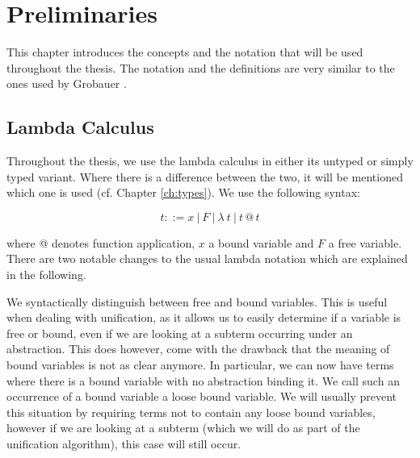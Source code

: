\newcommand{\app}{\mathbin{@}}
\newcommand{\abstr}[1]{\lambda \ #1}
\newcommand{\abstrm}[2]{\lambda_{#1} \ #2}
\newcommand{\abstrn}[2]{\lambda #1. \ #2}
\newcommand{\subst}[3]{#1 \left[#2 / #3 \right]}
\newcommand{\doubleplus}{\mathbin{+\mkern-10mu+}}
\newcommand{\cons}{\textbf{:}}
\newcommand{\betar}{\longrightarrow_\beta}
\newcommand{\betars}{\overset{*}{\longrightarrow}_\beta}
\newcommand{\betart}{\overset{+}{\longrightarrow}_\beta}
\newcommand{\betarm}[1]{\overset{#1}{\longrightarrow}_\beta}
\newcommand{\free}[2]{\text{free $#1$ $#2$}}
\newcommand{\decr}[2]{\text{decr $#1$ $#2$}}
\newcommand{\betaeta}{\longrightarrow_{\beta\eta}}
\newcommand{\betaetas}{\overset{*}{\longrightarrow}_{\beta\eta}}
\newcommand{\unif}[2]{#1 \overset{?}{=} #2}
\newcommand{\applist}[1]{\llparenthesis #1 \rrparenthesis}
\newcommand{\tab}{\hspace*{10pt}}
\newcommand{\betanormal}[1]{#1\mkern-5mu\downarrow_\beta}
\newcommand{\etars}{\overset{*}{\longrightarrow}_\eta}

\chapter{Preliminaries}
\label{ch:pre}

This chapter introduces the concepts and the notation that will be used throughout the thesis. The notation and the definitions are very similar to the ones used by Grobauer \cite{Grobauer}.

\section{Lambda Calculus}
\label{sec:lam}

Throughout the thesis, we use the lambda calculus in either its untyped or simply typed variant. Where there is a difference between the two, it will be mentioned which one is used (cf. Chapter \ref{ch:types}). We use the following syntax:

\[t ::= x \ | \ F \ | \ \abstr{t} \ | \ t \app t\]

where @ denotes function application, $x$ a bound variable and $F$ a free variable. There are two notable changes to the usual lambda notation which are explained in the following.

We syntactically distinguish between free and bound variables. This is useful when dealing with unification, as it allows us to easily determine if a variable is free or bound, even if we are looking at a subterm occurring under an abstraction. This does however, come with the drawback that the meaning of bound variables is not as clear anymore. In particular, we can now have terms where there is a bound variable with no abstraction binding it. We call such an occurrence of a bound variable a loose bound variable. We will usually prevent this situation by requiring terms not to contain any loose bound variables, however if we are looking at a subterm (which we will do as part of the unification algorithm), this case will still occur.

